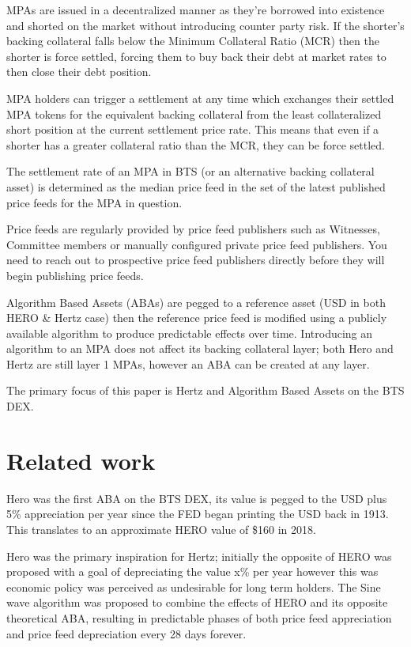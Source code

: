 \documentclass[sigconf]{acmart}
\begin{document}
\medskip

MPAs are issued in a decentralized manner as they're borrowed into existence and shorted on the market without introducing counter party risk. If the shorter's backing collateral falls below the Minimum Collateral Ratio (MCR) then the shorter is force settled, forcing them to buy back their debt at market rates to then close their debt position.\citep{bitshares_foundation_dex_2018}

MPA holders can trigger a settlement at any time which exchanges their settled MPA tokens for the equivalent backing collateral from the least collateralized short position at the current settlement price rate. This means that even if a shorter has a greater collateral ratio than the MCR, they can be force settled.\citep{bitshares_foundation_dex_2018}

The settlement rate of an MPA in BTS (or an alternative backing collateral asset) is determined as the median price feed in the set of the latest published price feeds for the MPA in question.\citep{bitshares_foundation_dex_2018}

Price feeds are regularly provided by price feed publishers such as Witnesses, Committee members or manually configured private price feed publishers. You need to reach out to prospective price feed publishers directly before they will begin publishing price feeds.

Algorithm Based Assets (ABAs) are pegged to a reference asset (USD in both HERO \& Hertz case) then the reference price feed is modified using a publicly available algorithm to produce predictable effects over time. Introducing an algorithm to an MPA does not affect its backing collateral layer; both Hero and Hertz are still layer 1 MPAs, however an ABA can be created at any layer.

The primary focus of this paper is Hertz and Algorithm Based Assets on the BTS DEX.

\section{Related work}

Hero was the first ABA on the BTS DEX, its value is pegged to the USD plus 5\% appreciation per year since the FED began printing the USD back in 1913. This translates to an approximate HERO value of \$160 in 2018.\citep{hero_hero_2018}

Hero was the primary inspiration for Hertz; initially the opposite of HERO was proposed with a goal of depreciating the value x\% per year however this was economic policy was perceived as undesirable for long term holders.\citep{customminer_nemesis_2018} The Sine wave algorithm was proposed to combine the effects of HERO and its opposite theoretical ABA, resulting in predictable phases of both price feed appreciation and price feed depreciation every 28 days forever.
\end{document}

